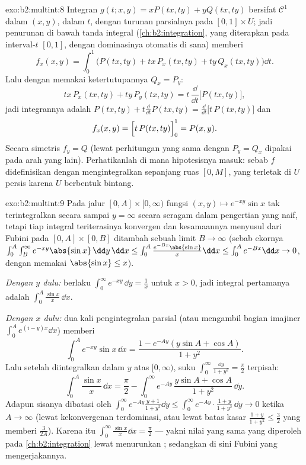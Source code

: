 \begin{solution}{exo:b2:multint:8}
Integran $g(t; x, y) = xP(tx, ty) + yQ(tx, ty)$ bersifat
$\mathcal{C}^1$ dalam $(x, y)$,  dalam $t$, dengan turunan
parsialnya  pada $[0,1] \times U$; jadi penurunan di bawah
tanda integral (\cref{ch:b2:integration}, yang diterapkan pada
interval-$t$  $[0,1]$, dengan dominasinya otomatis di sana)
memberi
\[
f_x(x, y)
= \int_0^1 \bigl(P(tx, ty) + tx\,P_x(tx, ty)
+ ty\,Q_x(tx, ty)\bigr)\dd t .
\]
Lalu dengan memakai ketertutupannya $Q_x = P_y$:
\[
tx\,P_x(tx, ty) + ty\,P_y(tx, ty)
= t\,\frac{\dd}{\dd t}\bigl[P(tx, ty)\bigr] ,
\]
jadi integrannya adalah $P(tx, ty) + t\frac{\dd}{\dd t}P(tx, ty) =
\frac{\dd}{\dd t}\bigl[t\,P(tx, ty)\bigr]$ dan
\[
f_x(x, y) = \Bigl[t\,P(tx, ty)\Bigr]_0^1 = P(x, y) .
\]
Secara simetris $f_y = Q$ (lewat perhitungan yang sama dengan $P_y = Q_x$ dipakai
pada arah yang lain). Perhatikanlah di mana hipotesisnya masuk: sebab $f$ didefinisikan
dengan mengintegralkan sepanjang ruas $[0, M]$, yang terletak di $U$
persis karena $U$ berbentuk bintang.
\end{solution}

\begin{solution}{exo:b2:multint:9}
Pada jalur $[0, A] \times [0, \infty)$ fungsi $(x, y)
\mapsto e^{-xy}\sin x$ tak terintegralkan secara  sampai $y =
\infty$ secara seragam dalam pengertian yang naif, tetapi tiap integral teriterasinya
konvergen dan kesamaannya menyusul dari Fubini pada $[0, A]
\times [0, B]$ ditambah sebuah limit $B \to \infty$ (sebab ekornya
$\int_0^A\int_B^\infty e^{-xy}\abs{\sin x}\,\dd y\,\dd x \leq
\int_0^A \frac{e^{-Bx}\abs{\sin x}}{x}\dd x \leq \int_0^A e^{-Bx}
\dd x\to 0$, dengan memakai $\abs{\sin x} \leq x$).

\emph{Dengan $y$ dulu:} berlaku $\int_0^\infty e^{-xy}\,\dd y = \frac1x$ untuk $x
> 0$, jadi integral pertamanya adalah $\int_0^A \frac{\sin x}{x}\,\dd x$.

\emph{Dengan $x$ dulu:} dua kali pengintegralan parsial (atau mengambil
bagian imajiner $\int_0^A e^{(i - y)x}\dd x$) memberi
\[
\int_0^A e^{-xy}\sin x\,\dd x
= \frac{1 - e^{-Ay}(y\sin A + \cos A)}{1 + y^2} .
\]
Lalu setelah diintegralkan dalam $y$ atas $[0, \infty)$, suku $\int_0^\infty
\frac{\dd y}{1 + y^2} = \frac\pi2$ terpisah:
\[
\int_0^A \frac{\sin x}{x}\,\dd x
= \frac{\pi}{2}
- \int_0^\infty e^{-Ay}\,\frac{y\sin A + \cos A}{1 + y^2}\,\dd y .
\]
Adapun sisanya dibatasi oleh $\int_0^\infty e^{-Ay}\frac{y +
1}{1 + y^2}\dd y \leq \int_0^\infty e^{-Ay}\cdot\frac{1+y}{1+y^2}
\,\dd y \to 0$ ketika $A \to \infty$ (lewat kekonvergenan terdominasi, atau
lewat batas kasar $\frac{1 + y}{1 + y^2} \leq \frac32$ yang memberi
$\frac{3}{2A}$). Karena itu $\int_0^\infty\frac{\sin x}{x}\dd x =
\frac\pi2$ --- yakni nilai yang sama yang diperoleh pada
\cref{ch:b2:integration} lewat menurunkan ;
sedangkan di sini Fubini yang mengerjakannya.
\end{solution}

